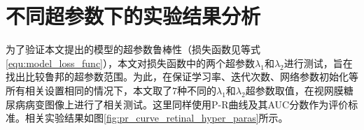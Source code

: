 
\section{不同超参数下的实验结果分析}\label{sec:hyper_paras}
为了验证本文提出的模型的超参数鲁棒性（损失函数见等式\ref{equ:model_loss_func}），本文对损失函数中的两个超参数$\lambda_{1}$和$\lambda_{2}$进行测试，旨在找出比较鲁邦的超参数范围。为此，在保证学习率、迭代次数、网络参数初始化等所有相关设置相同的情况下，本文取了$7$种不同的$\lambda_{1}$和$\lambda_{2}$超参数取值，在视网膜糖尿病病变图像上进行了相关测试。这里同样使用P-R曲线及其AUC分数作为评价标准。相关实验结果如图\ref{fig:pr_curve_retinal_hyper_paras}所示。
